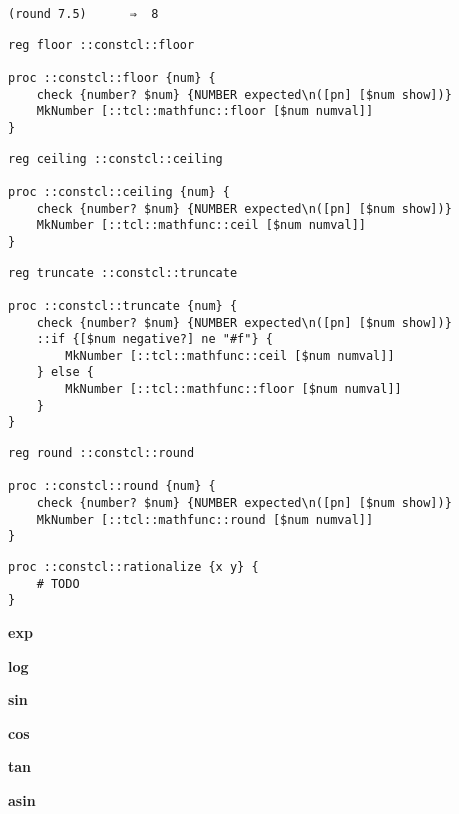 \documentclass{report}
\begin{document}
\noindent\makebox[\linewidth]{\rule{\linewidth}{0.4pt}}
\begin{lstlisting}
(round 7.5)      ⇒  8
\end{lstlisting}
\noindent\makebox[\linewidth]{\rule{\linewidth}{0.4pt}}
\noindent\makebox[\linewidth]{\rule{\linewidth}{0.4pt}}
\begin{lstlisting}
reg floor ::constcl::floor
 
proc ::constcl::floor {num} {
    check {number? $num} {NUMBER expected\n([pn] [$num show])}
    MkNumber [::tcl::mathfunc::floor [$num numval]]
}
\end{lstlisting}
\noindent\makebox[\linewidth]{\rule{\linewidth}{0.4pt}}
\noindent\makebox[\linewidth]{\rule{\linewidth}{0.4pt}}
\begin{lstlisting}
reg ceiling ::constcl::ceiling
 
proc ::constcl::ceiling {num} {
    check {number? $num} {NUMBER expected\n([pn] [$num show])}
    MkNumber [::tcl::mathfunc::ceil [$num numval]]
}
\end{lstlisting}
\noindent\makebox[\linewidth]{\rule{\linewidth}{0.4pt}}
\noindent\makebox[\linewidth]{\rule{\linewidth}{0.4pt}}
\begin{lstlisting}
reg truncate ::constcl::truncate
 
proc ::constcl::truncate {num} {
    check {number? $num} {NUMBER expected\n([pn] [$num show])}
    ::if {[$num negative?] ne "#f"} {
        MkNumber [::tcl::mathfunc::ceil [$num numval]]
    } else {
        MkNumber [::tcl::mathfunc::floor [$num numval]]
    }
}
\end{lstlisting}
\noindent\makebox[\linewidth]{\rule{\linewidth}{0.4pt}}
\noindent\makebox[\linewidth]{\rule{\linewidth}{0.4pt}}
\begin{lstlisting}
reg round ::constcl::round
 
proc ::constcl::round {num} {
    check {number? $num} {NUMBER expected\n([pn] [$num show])}
    MkNumber [::tcl::mathfunc::round [$num numval]]
}
\end{lstlisting}
\noindent\makebox[\linewidth]{\rule{\linewidth}{0.4pt}}
\noindent\makebox[\linewidth]{\rule{\linewidth}{0.4pt}}
\begin{lstlisting}
proc ::constcl::rationalize {x y} {
    # TODO
}
\end{lstlisting}
\noindent\makebox[\linewidth]{\rule{\linewidth}{0.4pt}}

\textbf{exp}


\textbf{log}


\textbf{sin}


\textbf{cos}


\textbf{tan}


\textbf{asin}
\end{document}
